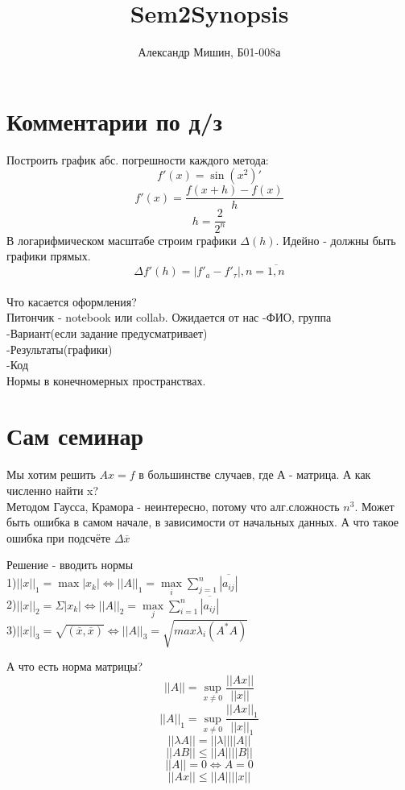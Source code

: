 \documentclass[a4paper,12pt]{article}
\title{Sem2Synopsis}
\author{Александр Мишин, Б01-008а}
\date{}
\begin{document}
\maketitle

\section{Комментарии по д/з}
    Построить график абс. погрешности каждого метода:
    $$f'(x) = \sin(x^2)'$$
    $$f'(x) = \frac{f(x+h) - f(x)}{h}$$
    $$h = \frac{2}{2^n}$$
    В логарифмическом масштабе строим графики $\Delta(h)$. Идейно - должны быть графики прямых.
    $$\Delta f'(h) = |f'_a - f'_\tau|,  n = \overline{1, n}$$
    \\

    Что касается оформления? \\
    Питончик - notebook или collab. Ожидается от нас 
        -ФИО, группа\\
        -Вариант(если задание предусматривает)\\
        -Результаты(графики)\\
        -Код\\

    Нормы в конечномерных пространствах.\\
    
\section{Сам семинар}
    Мы хотим решить $Ax = f$ в большинстве случаев, где А - матрица. А как численно найти x?\\
    Методом Гаусса, Крамора - неинтересно, потому что алг.сложность $n^3$. Может быть ошибка в самом начале, в зависимости от начальных данных. А что такое ошибка при подсчёте
    $\Delta \overline{x}$
    
    Решение - вводить нормы\\
    1)$||x||_1 = \max|x_k| \Leftrightarrow ||A||_1 = \max\limits_{i} \displaystyle\sum_{j=1}^{n} \overline{|a_{ij}|}$\\
    2)$||x||_2 = \Sigma |x_k| \Leftrightarrow ||A||_2 = \max\limits_{j} \displaystyle\sum_{i=1}^{n}
    \overline{|a_{ij}|}$\\
    3)$||x||_3 = \sqrt{(\overline{x}, \overline{x})} \Leftrightarrow ||A||_3 = \sqrt{max \lambda_i (A^*A)}$

    А что есть норма матрицы?\\
    $$||A|| = \sup_{x\neq0}\frac{||Ax||}{||x||}$$
    $$||A||_1 = \sup_{x\neq0}\frac{||Ax||_1}{||x||_1}$$
    $$||\lambda A|| = ||\lambda||||A||$$
    $$||AB|| \leq ||A||||B||$$
    $$||A|| = 0 \Leftrightarrow A = 0$$
    $$||Ax|| \leq ||A||||x||$$
    
\end{document}
